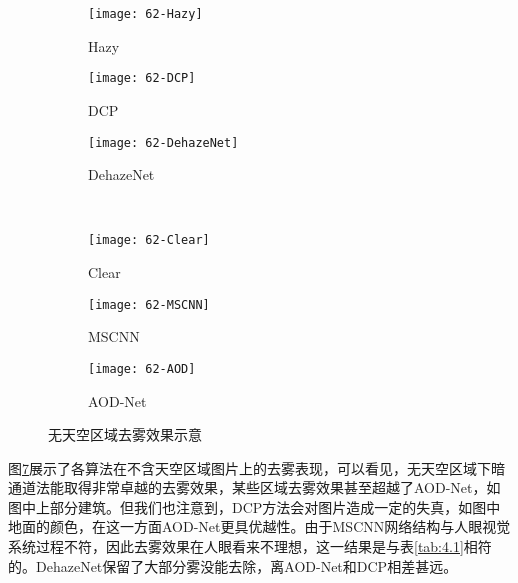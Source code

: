 \documentclass[a4paper, 12pt, oneside]{report}
\begin{document}
{\begin{figure}[htbp]
\begin{subfigure}{.33\textwidth}
  \centering
  \texttt{[image: 62-Hazy]}
  \caption{Hazy}
  \label{fig:sfig1}
\end{subfigure}%
\begin{subfigure}{.33\textwidth}
  \centering
  \texttt{[image: 62-DCP]}
  \caption{DCP}
  \label{fig:sfig2}
\end{subfigure}
\begin{subfigure}{.33\textwidth}
  \centering
  \texttt{[image: 62-DehazeNet]}
  \caption{DehazeNet}
  \label{fig:sfig3}
\end{subfigure} \\
\begin{subfigure}{.33\textwidth}
  \centering
  \texttt{[image: 62-Clear]}
  \caption{Clear}
  \label{fig:sfig4}
\end{subfigure}
\begin{subfigure}{.33\textwidth}
  \centering
  \texttt{[image: 62-MSCNN]}
  \caption{MSCNN}
  \label{fig:sfig5}
\end{subfigure}%
\begin{subfigure}{.33\textwidth}
  \centering
  \texttt{[image: 62-AOD]}
  \caption{AOD-Net}
  \label{fig:sfig6}
\end{subfigure}
\caption{无天空区域去雾效果示意}
\label{fig:4.1}
\end{figure}

图\ref{fig:4.1}展示了各算法在不含天空区域图片上的去雾表现，可以看见，无天空区域下暗通道法能取得非常卓越的去雾效果，某些区域去雾效果甚至超越了AOD-Net，如图中上部分建筑。但我们也注意到，DCP方法会对图片造成一定的失真，如图中地面的颜色，在这一方面AOD-Net更具优越性。由于MSCNN网络结构与人眼视觉系统过程不符，因此去雾效果在人眼看来不理想，这一结果是与表\ref{tab:4.1}相符的。DehazeNet保留了大部分雾没能去除，离AOD-Net和DCP相差甚远。

}
\end{document}
